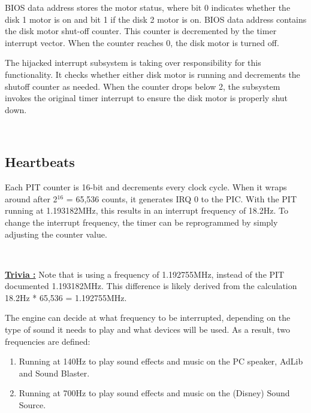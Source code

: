 \documentclass[book.tex]{subfiles}
\begin{document}
\par
BIOS data address  stores the motor status, where bit 0 indicates whether the disk 1 motor is on and bit 1 if the disk 2 motor is on. BIOS data address  contains the disk motor shut-off counter. This counter is decremented by the timer interrupt vector. When the counter reaches 0, the disk motor is turned off.\\

\par
The hijacked interrupt subsystem is taking over responsibility for this functionality. It checks whether either disk motor is running and decrements the shutoff counter as needed. When the counter drops below 2, the subsystem invokes the original timer interrupt to ensure the disk motor is properly shut down.\\

\par
\begin{minipage}{\textwidth}

\end{minipage}\\
\par

\subsection{Heartbeats}
Each PIT counter is 16-bit and decrements every clock cycle. When it wraps around after 2$^{16}$ = 65,536 counts, it generates IRQ 0 to the PIC. With the PIT running at 1.193182MHz, this results in an interrupt frequency of 18.2Hz. To change the interrupt frequency, the timer can be reprogrammed by simply adjusting the counter value.

\par
\begin{minipage}{\textwidth}

\end{minipage}\\
\par

\textbf{\underline{Trivia :}} Note that  is using a frequency of 1.192755MHz, instead of the PIT documented 1.193182MHz. This difference is likely derived from the calculation 18.2Hz * 65,536 = 1.192755MHz.\\

\par
The engine can decide at what frequency to be interrupted, depending on the type of sound it needs to play and what devices will be used. As a result, two frequencies are defined:
\begin{enumerate}
\item Running at 140Hz to play sound effects and music on the PC speaker, AdLib and Sound Blaster.
\item Running at 700Hz to play sound effects and music on the (Disney) Sound Source.
\end{enumerate}
\end{document}

